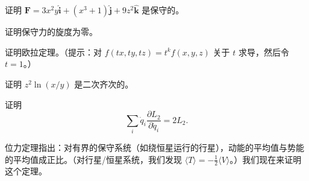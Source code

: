 \begin{example}
证明 $\mathbf{F} = 3x^2y\hat{\mathbf{i}} + (x^3 + 1)\hat{\mathbf{j}} + 9z^2\hat{\mathbf{k}}$ 是保守的。
\end{example}

\begin{example}
证明保守力的旋度为零。
\end{example}

\begin{example}
证明欧拉定理。（提示：对 $f(tx, ty, tz) = t^k f(x, y, z)$ 关于 $t$ 求导，然后令 $t = 1$。）
\end{example}

\begin{example}
证明 $z^2\ln(x/y)$ 是二次齐次的。
\end{example}

\begin{example}
证明
$$\sum_i\dot{q}_i\frac{\partial L_2}{\partial \dot{q}_i} = 2L_2.$$
\end{example}

位力定理指出：对有界的保守系统（如绕恒星运行的行星），动能的平均值与势能的平均值成正比。（对行星/恒星系统，我们发现 $\langle T\rangle = -\frac{1}{2}\langle V\rangle$。）我们现在来证明这个定理。

